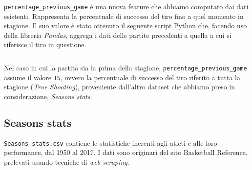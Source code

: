 \texttt{percentage\_previous\_game} è una nuova feature che abbiamo computato dai dati esistenti. Rappresenta la percentuale di successo del tiro fino a quel momento in stagione. Il suo valore è stato ottenuto il seguente script Python che, facendo uso della libreria \textit{Pandas}, aggrega i dati delle partite precedenti a quella a cui si riferisce il tiro in questione.

\begin{code}
\inputminted[breaklines]{python}{../datasets/shot_logs_nv.py}
\end{code}

Nel caso in cui la partita sia la prima della stagione, \texttt{percentage\_previous\_game} assume il valore \texttt{TS}, ovvero la percentuale di successo del tiro riferito a tutta la stagione (\textit{True Shooting}), proveniente dall'altro dataset che abbiamo preso in considerazione, \textit{Seasons stats}.

\subsection{Seasons stats}

\texttt{Seasons\_stats.csv} \cite{season_stats} contiene le statistiche inerenti agli atleti e alle loro performance, dal 1950 al 2017. I dati sono originari del sito Basketball Reference\cite{basketball-reference}, prelevati usando tecniche di \textit{web scraping}.

